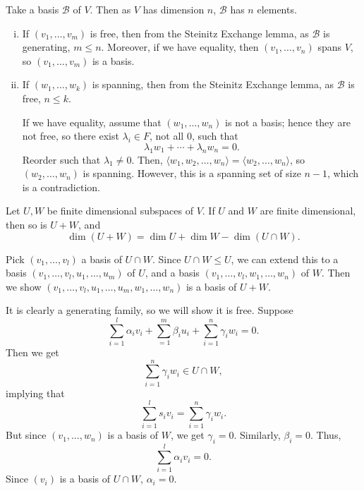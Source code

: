\documentclass[12pt]{article}
\begin{document}
\begin{proofbox}
	Take a basis $\mathcal{B}$ of $V$. Then as $V$ has dimension $n$, $\mathcal{B}$ has $n$ elements.
	\begin{enumerate}[(i)]
		\item If $(v_1, \ldots, v_m)$ is free, then from the Steinitz Exchange lemma, as $\mathcal{B}$ is generating, $m \leq n$. Moreover, if we have equality, then $(v_1, \ldots, v_n)$ spans $V$, so $(v_1, \ldots, v_m)$ is a basis.
		\item If $(w_1, \ldots, w_k)$ is spanning, then from the Steinitz Exchange lemma, as $\mathcal{B}$ is free, $n \leq k$.

			If we have equality, assume that $(w_1, \ldots, w_n)$ is not a basis; hence they are not free, so there exist $\lambda_i \in F$, not all $0$, such that
			\[
			\lambda_1 w_1 + \cdots + \lambda_n w_n = 0
			.\]
			Reorder such that $\lambda_1 \neq 0$. Then, $\langle w_1, w_2, \ldots, w_n \rangle = \langle w_2, \ldots, w_n \rangle$, so $(w_2, \ldots, w_n)$ is spanning. However, this is a spanning set of size $n-1$, which is a contradiction.
	\end{enumerate}
\end{proofbox}

\begin{proposition}
	Let $U, W$ be finite dimensional subspaces of $V$. If $U$ and $W$ are finite dimensional, then so is $U + W$, and
	\[
		\dim (U + W) = \dim U + \dim W - \dim(U \cap W)
	.\]
\end{proposition}

\begin{proofbox}
	Pick $(v_1, \ldots, v_l)$ a basis of $U \cap W$. Since $U \cap W \leq U$, we can extend this to a basis $(v_1, \ldots, v_l, u_1, \ldots, u_m)$ of $U$, and a basis $(v_1, \ldots, v_l, w_1, \ldots, w_n)$ of $W$. Then we show $(v_1, \ldots, v_l, u_1, \ldots, u_m, w_1, \ldots, w_n)$ is a basis of $U + W$.

	It is clearly a generating family, so we will show it is free. Suppose
	\[
		\sum_{i = 1}^{l} \alpha_i v_i + \sum_{ = 1}^{m} \beta_i u_i + \sum_{i = 1}^{n} \gamma_i w_i = 0
	.\]
	Then we get
	\[
	\sum_{i = 1}^{n} \gamma_i w_i \in U \cap W
	,\]
	implying that
	\[
	\sum_{i = 1}^{l} s_i v_i = \sum_{i = 1}^{n} \gamma_i w_i
	.\]
	But since $(v_1, \ldots, w_n)$ is a basis of $W$, we get $\gamma_i = 0$. Similarly, $\beta_i = 0$. Thus,
	\[
	\sum_{i = 1}^{l} \alpha_i v_i = 0
	.\]
	Since $(v_i)$ is a basis of $U \cap W$, $\alpha_i = 0$.
\end{proofbox}
\end{document}
